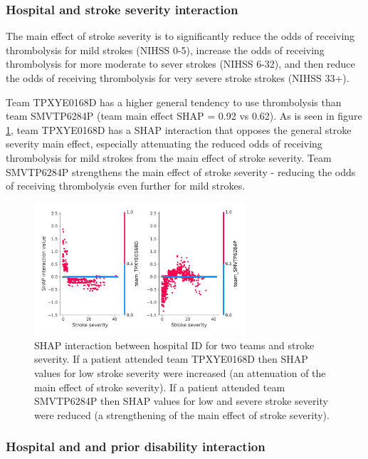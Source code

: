\subsubsection{Hospital and stroke severity interaction}

The main effect of stroke severity is to significantly reduce the odds of receiving thrombolysis for mild strokes (NIHSS 0-5), increase the odds of receiving thrombolysis for more moderate to sever strokes (NIHSS 6-32), and then reduce the odds of receiving thrombolysis for very severe stroke strokes (NIHSS 33+).

Team TPXYE0168D has a higher general tendency to use thrombolysis than team SMVTP6284P (team main effect SHAP = 0.92 vs 0.62). As is seen in figure \ref{fig:interaction_nihss}, team TPXYE0168D has a SHAP interaction that opposes the general stroke severity main effect, especially attenuating the reduced odds of receiving thrombolysis for mild strokes from the main effect of stroke severity. Team SMVTP6284P strengthens the main effect of stroke severity - reducing the odds of receiving thrombolysis even further for mild strokes.

\begin{figure}
\centering
\includegraphics[width=0.7\textwidth]{./images/12ab_stroke_severity_interaction_example}
\caption{SHAP interaction between hospital ID for two teams and stroke severity. If a patient attended team TPXYE0168D then SHAP values for low stroke severity were increased (an attenuation of the main effect of stroke severity). If a patient attended team SMVTP6284P then SHAP values for low and severe stroke severity were reduced (a strengthening of the main effect of stroke severity).}
\label{fig:interaction_nihss}
\end{figure}


\subsubsection{Hospital and and prior disability interaction}

